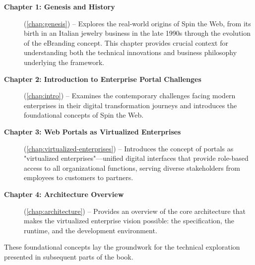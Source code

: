\begin{description}
\item[\textbf{Chapter 1: Genesis and History}] (\cref{chap:genesis}) -- Explores the real-world origins of Spin the Web, from its birth in an Italian jewelry business in the late 1990s through the evolution of the eBranding concept. This chapter provides crucial context for understanding both the technical innovations and business philosophy underlying the framework.

\item[\textbf{Chapter 2: Introduction to Enterprise Portal Challenges}] (\cref{chap:intro}) -- Examines the contemporary challenges facing modern enterprises in their digital transformation journeys and introduces the foundational concepts of Spin the Web.

\item[\textbf{Chapter 3: Web Portals as Virtualized Enterprises}] (\cref{chap:virtualized-enterprises}) -- Introduces the concept of portals as "virtualized enterprises"—unified digital interfaces that provide role-based access to all organizational functions, serving diverse stakeholders from employees to customers to partners.

\item[\textbf{Chapter 4: Architecture Overview}] (\cref{chap:architecture}) -- Provides an overview of the core architecture that makes the virtualized enterprise vision possible: the \wbol{} specification, the \webspinner{} runtime, and the \studio{} development environment.
\end{description}

These foundational concepts lay the groundwork for the technical exploration presented in subsequent parts of the book.
